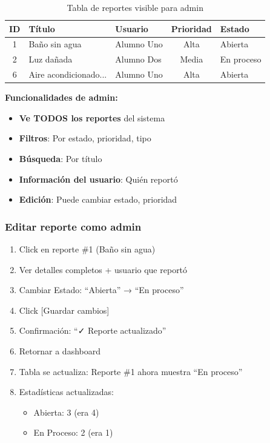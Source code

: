 \documentclass[12pt, a4paper, spanish]{article}
\begin{document}
\begin{table}[H]
\centering
\caption{Tabla de reportes visible para admin}
\small
\begin{tabular}{|c|l|l|c|l|}
\hline
\textbf{ID} & \textbf{Título} & \textbf{Usuario} & \textbf{Prioridad} & \textbf{Estado} \\
\hline
1 & Baño sin agua & Alumno Uno & Alta & Abierta \\
2 & Luz dañada & Alumno Dos & Media & En proceso \\
6 & Aire acondicionado... & Alumno Uno & Alta & Abierta \\
\hline
\end{tabular}
\end{table}

\textbf{Funcionalidades de admin:}

\begin{itemize}
    \item \textbf{Ve TODOS los reportes} del sistema
    \item \textbf{Filtros}: Por estado, prioridad, tipo
    \item \textbf{Búsqueda}: Por título
    \item \textbf{Información del usuario}: Quién reportó
    \item \textbf{Edición}: Puede cambiar estado, prioridad
\end{itemize}

\subsubsection{Editar reporte como admin}

\begin{enumerate}
    \item Click en reporte \#1 (Baño sin agua)
    \item Ver detalles completos + usuario que reportó
    \item Cambiar Estado: ``Abierta'' → ``En proceso''
    \item Click [Guardar cambios]
    \item Confirmación: ``✓ Reporte actualizado''
    \item Retornar a dashboard
    \item Tabla se actualiza: Reporte \#1 ahora muestra ``En proceso''
    \item Estadísticas actualizadas:
    \begin{itemize}
        \item Abierta: 3 (era 4)
        \item En Proceso: 2 (era 1)
    \end{itemize}
\end{enumerate}
\end{document}
